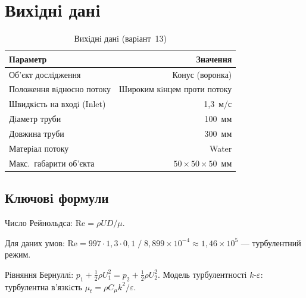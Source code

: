 
\usepackage{../common/labstyle}



\maketitle
\tableofcontents
\newpage

\section{Вихiднi данi}

\begin{table}[H]
  \centering
  \caption{Вихiднi данi (варiант~13)}
  \begin{tabularx}{0.75\textwidth}{Xr}
    \toprule
    \textbf{Параметр} & \textbf{Значення} \\
    \midrule
    Об'єкт дослiдження         & Конус (воронка) \\
    Положення вiдносно потоку  & Широким кiнцем проти потоку \\
    Швидкiсть на входi (Inlet) & 1{,}3~м/с \\
    Дiаметр труби              & 100~мм \\
    Довжина труби              & 300~мм \\
    Матерiал потоку            & Water \\
    Макс.\ габарити об'єкта    & $50 \times 50 \times 50$~мм \\
    \bottomrule
  \end{tabularx}
\end{table}

\subsection{Ключовi формули}

Число Рейнольдса: $\mathrm{Re} = \rho U D / \mu$.

Для даних умов: $\mathrm{Re} = 997 \cdot 1{,}3 \cdot 0{,}1 \;/\; 8{,}899 \times 10^{-4} \approx 1{,}46 \times 10^5$ --- турбулентний режим.

Рiвняння Бернуллi: $p_1 + \tfrac{1}{2}\rho U_1^2 = p_2 + \tfrac{1}{2}\rho U_2^2$.
Модель турбулентностi $k$-$\varepsilon$: турбулентна в'язкiсть $\mu_t = \rho C_\mu k^2/\varepsilon$.

